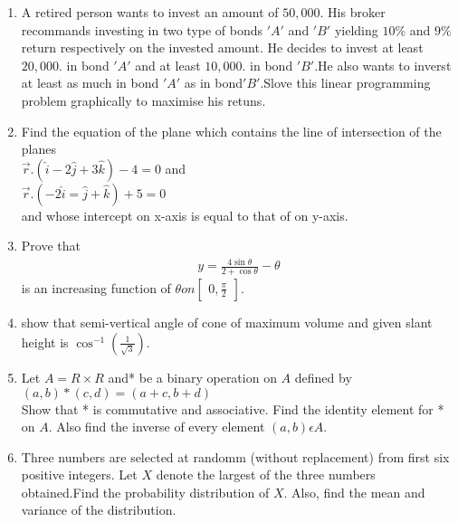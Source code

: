 \documentclass[12pt,-letter paper]{article}
\providecommand{\myvec}[1]{\ensuremath{\begin{bmatrix}#1\end{bmatrix}}}
\providecommand{\brak}[1]{\ensuremath{\left(#1\right)}}
\begin{document}
\begin{enumerate}
  \item A retired person wants to invest an amount of \rupee$50,000$. His broker recommands investing in two type of bonds $'A'$ and $'B'$ yielding $10\%$ and $9\%$ return respectively on the invested amount. He decides to invest at least\rupee$20,000$. in bond $'A'$ and at least \rupee$10,000$. in bond $'B'$.He also wants to inverst at least as much in bond $'A'$ as in bond$'B'$.Slove this linear programming problem graphically to maximise his retuns.


  \item Find the equation of the plane which contains the line of intersection of the planes\\
	  $\overset{\rightarrow}{r}.\brak{\hat{i}-2\hat{j}+3\hat{k}}-4=0$ and \\ $\overset{\rightarrow}{r}.\brak{-2\hat{i}=\hat{j}+\hat{k}}+5=0$\\ and whose intercept on x-axis is equal to that of on y-axis.
    

  \item Prove that \begin{align*} y=\frac{4\sin{\theta}}{2+\cos{\theta}}-\theta \end{align*} is an increasing function of $\theta on  \myvec{0,\frac{\pi}{2}}$. 

  \item  show that semi-vertical angle of cone of maximum volume and given slant height is  $\cos^{-1}(\frac{1}{\sqrt{3}})$.
     
  \item Let $A=R\times R$ and* be a binary operation on $A$ defined by\\ $\brak{a,b}*\brak{c,d}=\brak{a+c,b+d}$\\
	  Show that * is commutative and associative. Find the identity element for * on $A$. Also find the inverse of every element $\brak{a,b}\epsilon A$.

 
   \item Three numbers are selected at randomm (without replacement) from first six positive integers. Let $X$ denote the largest of the three numbers obtained.Find the probability distribution of $X$. Also, find the mean and variance of the distribution.

\end{enumerate}        
\end{document}
